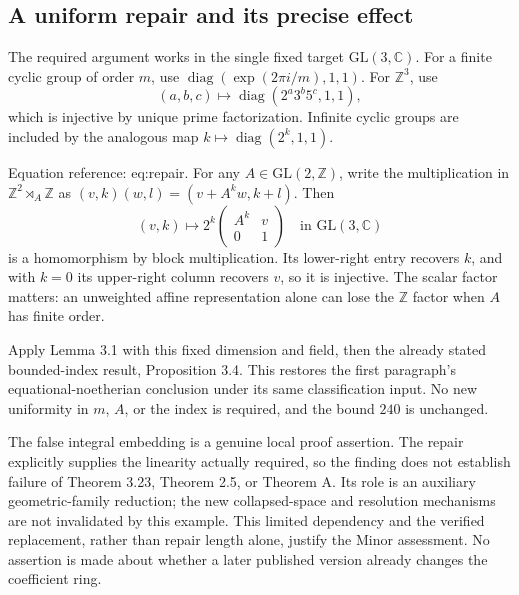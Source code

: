\documentclass[10pt]{article}
\begin{document}
\subsection*{A uniform repair and its precise effect}
The required argument works in the single fixed target \(\mathrm{GL}(3,\mathbb C)\). For a finite cyclic group of order \(m\), use \(\operatorname{diag}(\exp(2\pi i/m),1,1)\). For \(\mathbb Z^3\), use \[(a,b,c)\longmapsto
 \operatorname{diag}(2^a3^b5^c,1,1),\] which is injective by unique prime factorization. Infinite cyclic groups are included by the analogous map \(k\mapsto
\operatorname{diag}(2^k,1,1)\).\par
Equation reference: eq:repair. For any \(A\in\mathrm{GL}(2,\mathbb Z)\), write the multiplication in \(\mathbb Z^2\rtimes_A\mathbb Z\) as \((v,k)(w,l)=(v+A^k w,k+l)\). Then \[
 (v,k)\longmapsto
 2^k
 \begin{pmatrix}
 A^k&v\\
 0&1
 \end{pmatrix}
 \quad\text{in }\mathrm{GL}(3,\mathbb C)\] is a homomorphism by block multiplication. Its lower-right entry recovers \(k\), and with \(k=0\) its upper-right column recovers \(v\), so it is injective. The scalar factor matters: an unweighted affine representation alone can lose the \(\mathbb Z\) factor when \(A\) has finite order.\par
Apply Lemma 3.1 with this fixed dimension and field, then the already stated bounded-index result, Proposition 3.4. This restores the first paragraph’s equational-noetherian conclusion under its same classification input. No new uniformity in \(m\), \(A\), or the index is required, and the bound \(240\) is unchanged.\par
The false integral embedding is a genuine local proof assertion. The repair explicitly supplies the linearity actually required, so the finding does not establish failure of Theorem 3.23, Theorem 2.5, or Theorem A. Its role is an auxiliary geometric-family reduction; the new collapsed-space and resolution mechanisms are not invalidated by this example. This limited dependency and the verified replacement, rather than repair length alone, justify the Minor assessment. No assertion is made about whether a later published version already changes the coefficient ring.\par
\end{document}
